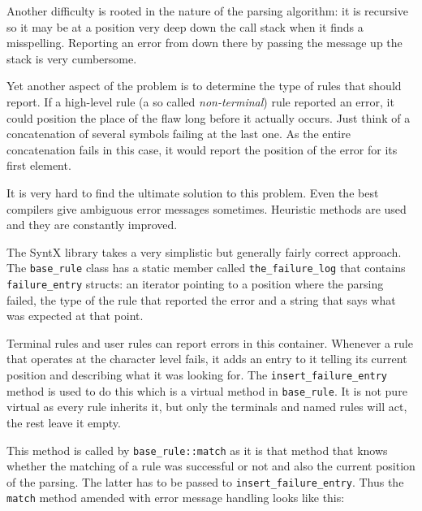 \documentclass[12pt]{article}
\begin{document}
Another difficulty is rooted in the nature of the parsing algorithm: it is recursive so it may be at a
position very deep down the call stack when it finds a misspelling. Reporting an error from down there by
passing the message up the stack is very cumbersome.

Yet another aspect of the problem is to determine the type of rules that should report. If a high-level rule
(a so called \emph{non-terminal}) rule reported an error, it could position the place of the flaw long before
it actually occurs. Just think of a concatenation of several symbols failing at the last one. As the entire
concatenation fails in this case, it would report the position of the error for its first element. 

It is very hard to find the ultimate solution to this problem. Even the best compilers give ambiguous error
messages sometimes. Heuristic methods are used and they are constantly improved.

The SyntX library takes a very simplistic but generally fairly correct approach. The \texttt{base\_rule} class
has a static member called \texttt{the\_failure\_log} that contains \texttt{failure\_entry} structs: an
iterator pointing to a position where the parsing failed, the type of the rule that reported the error and a
string that says what was expected at that point.

Terminal rules and user rules can report errors in this container. Whenever a rule that operates at the
character level fails, it adds an entry to it telling its current position and describing what it was looking
for. The \texttt{insert\_failure\_entry} method is used to do this which is a virtual method in
\texttt{base\_rule}. It is not pure virtual as every rule inherits it, but only the terminals and named rules
will act, the rest leave it empty.

This method is called by \texttt{base\_rule::match} as it is that method that knows whether the matching of a
rule was successful or not and also the current position of the parsing. The latter has to be passed to
\texttt{insert\_failure\_entry}. Thus the \texttt{match} method amended with error message handling looks
like this:
\end{document}
